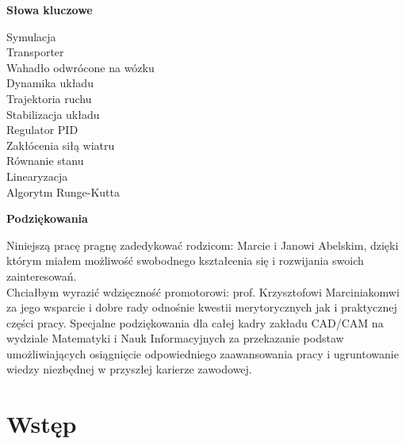 \documentclass[12pt, oneside]{report}
\theoremstyle{definition}
\begin{document}

\newpage
\pagestyle{empty}
\vspace*{\fill}
\begin{center}
\LARGE\textbf{Słowa kluczowe}\\
\end{center}
\begin{center}
Symulacja\\
Transporter\\
Wahadło odwrócone na wózku\\
Dynamika układu\\
Trajektoria ruchu\\
Stabilizacja układu\\
Regulator PID\\
Zakłócenia siłą wiatru \\
Równanie stanu\\
Linearyzacja\\
Algorytm Runge-Kutta
\end{center}
\vspace{\fill}

\newpage
\pagestyle{empty}
\vspace*{\fill}
\begin{center}
\LARGE\textbf{Podziękowania}\\
\end{center}
Niniejszą pracę pragnę zadedykować rodzicom: Marcie i Janowi Abelskim, dzięki którym miałem możliwość swobodnego kształcenia się i rozwijania swoich zainteresowań.
\vspace{10px}
\\
Chciałbym wyrazić wdzięczność promotorowi: prof. Krzysztofowi Marciniakomwi za jego wsparcie i dobre rady odnośnie kwestii merytorycznych jak i praktycznej części pracy. Specjalne podziękowania dla całej kadry zakładu CAD/CAM na wydziale Matematyki i Nauk Informacyjnych za przekazanie podstaw umożliwiających osiągnięcie odpowiedniego zaawansowania pracy i ugruntowanie wiedzy niezbędnej w przyszłej karierze zawodowej.

\vspace{\fill}

\newpage
\pagestyle{plain}
\setcounter{page}{5}
\tableofcontents

\newpage
\pagestyle{headings}

\chapter{Wstęp}
\end{document}

